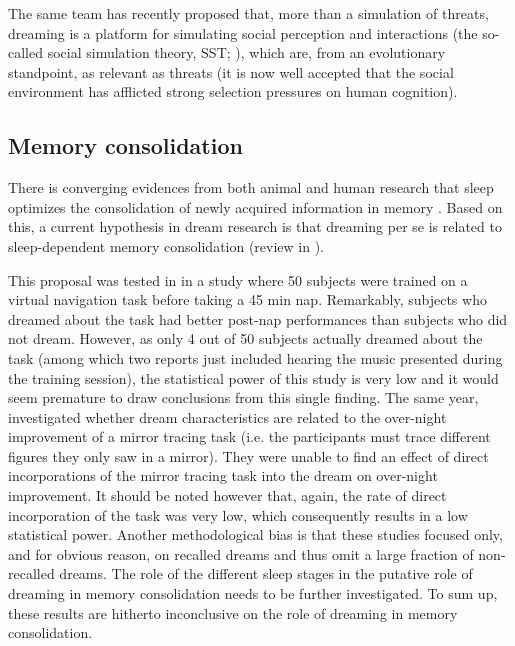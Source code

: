 The same team has recently proposed that, more than a simulation of threats, dreaming is a platform for simulating social perception and interactions (the so-called social simulation theory, SST; \citealp{revonsuo_avatars_2015}), which are, from an evolutionary standpoint, as relevant as threats (it is now well accepted that the social environment has afflicted strong selection pressures on human cognition).

\subsection{Memory consolidation}
\label{sec:dream-func:modern:memory}

There is converging evidences from both animal and human research that sleep optimizes the consolidation of newly acquired information in memory \citep{rasch_odor_2007, diekelmann_memory_2010}. Based on this, a current hypothesis in dream research is that dreaming per se is related to sleep-dependent memory consolidation (review in \citealp{schredl_is_2017}).

This proposal was tested in \citet{wamsley_dreaming_2010} in a study where 50 subjects were trained on a virtual navigation task before taking a 45 min nap. Remarkably, subjects who dreamed about the task had better post-nap performances than subjects who did not dream. However, as only 4 out of 50 subjects actually dreamed about the task (among which two reports just included hearing the music presented during the training session), the statistical power of this study is very low and it would seem premature to draw conclusions from this single finding. The same year, \citet{schredl_is_2010} investigated whether dream characteristics are related to the over-night improvement of a mirror tracing task (i.e. the participants must trace different figures they only saw in a mirror). They were unable to find an effect of direct incorporations of the mirror tracing task into the dream on over-night improvement. It should be noted however that, again, the rate of direct incorporation of the task was very low, which consequently results in a low statistical power. Another methodological bias is that these studies focused only, and for obvious reason, on recalled dreams and thus omit a large fraction of non-recalled dreams. The role of the different sleep stages in the putative role of dreaming in memory consolidation needs to be further investigated. To sum up, these results are hitherto inconclusive on the role of dreaming in memory consolidation.

